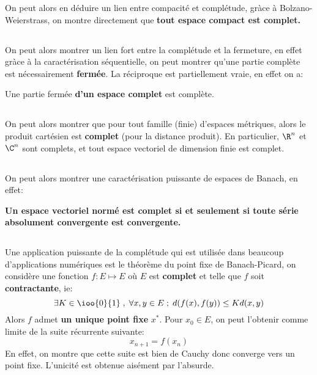 On peut alors en déduire un lien entre compacité et complétude, gràce à Bolzano-Weierstrass, on montre directement que \textbf{tout espace compact est complet.}

\subsection*{}
On peut alors montrer un lien fort entre la complétude et la fermeture, en effet gràce à la caractérisation séquentielle, on peut montrer qu'une partie complète est nécessairement \textbf{fermée}. La réciproque est partiellement vraie, en effet on a:
\begin{center}
   Une partie fermée \textbf{d'un espace complet} est complète.
\end{center}
\subsection*{}
On peut alors montrer que pour tout famille (finie) d'espaces métriques, alors le produit cartésien est \textbf{complet} (pour la distance produit). En particulier, \( \R^n \) et \( \C^n \) sont complets, et tout espace vectoriel de dimension finie est complet.
\subsection*{}
On peut alors montrer une caractérisation puissante de espaces de Banach, en effet:
\begin{center}
   \textbf{Un espace vectoriel normé est complet si et seulement si toute série absolument convergente est convergente.}
\end{center}

\subsection*{}
Une application puissante de la complétude qui est utilisée dans beaucoup d'applications numériques est le théorème du point fixe de Banach-Picard, on considère une fonction \( f : E \longmapsto E \) où \( E \) est \textbf{complet} et telle que \( f \) soit \textbf{contractante}, ie:
\[ 
   \exists K \in \ioo{0}{1} \; , \; \forall x, y \in E \; ; \; d(f(x), f(y)) \leq K d(x, y) 
\]
Alors \( f \) admet \textbf{un unique point fixe} \( x^* \). Pour \( x_0 \in E \), on peut l'obtenir comme limite de la suite récurrente suivante:
\[ 
   x_{n+1} = f(x_n)
\]
En effet, on montre que cette suite est bien de Cauchy donc converge vers un point fixe. L'unicité est obtenue aisément par l'absurde.